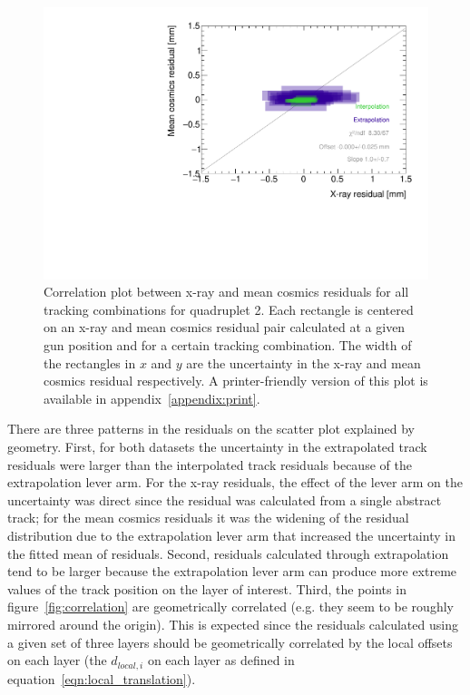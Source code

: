 \begin{figure}
    \centering
    \includegraphics[width = \textwidth]{figures/figure_QL2P08_3100V_2021-08-16_QL2P08_local_cosmic_and_xray_data_correlation_plot.pdf}
    \caption{Correlation plot between x-ray and mean cosmics residuals for all tracking combinations for quadruplet 2. Each rectangle is centered on an x-ray and mean cosmics residual pair calculated at a given gun position and for a certain tracking combination. The width of the rectangles in $x$ and $y$ are the uncertainty in the x-ray and mean cosmics residual respectively. A printer-friendly version of this plot is available in appendix~\ref{appendix:print}.}
    \label{fig:no_correlation}
\end{figure}

There are three patterns in the residuals on the scatter plot explained by geometry. First, for both datasets the uncertainty in the extrapolated track residuals were larger than the interpolated track residuals because of the extrapolation lever arm. For the x-ray residuals, the effect of the lever arm on the uncertainty was direct since the residual was calculated from a single abstract track; for the mean cosmics residuals it was the widening of the residual distribution due to the extrapolation lever arm that increased the uncertainty in the fitted mean of residuals. Second, residuals calculated through extrapolation tend to be larger because the extrapolation lever arm can produce more extreme values of the track position on the layer of interest. Third, the points in figure~\ref{fig:correlation} are geometrically correlated (e.g. they seem to be roughly mirrored around the origin). This is expected since the residuals calculated using a given set of three layers should be geometrically correlated by the local offsets on each layer (the $d_{local, i}$ on each layer as defined in equation~\ref{eqn:local_translation}). 


